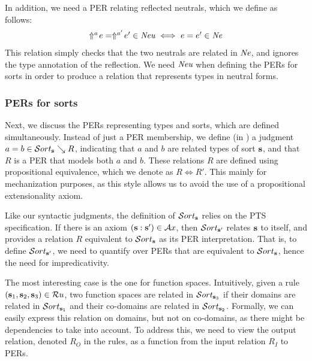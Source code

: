 In addition, we need a \ac{PER} relating reflected neutrals, which we define as follows:
\[
\begin{array}{l@{~\iff~}l}
  \perrel {\dreflect a e} {\dreflect {a'} {e'}} \perneu & \perrel e {e'} \perne
\end{array}
\]
This relation simply checks that the two neutrals are related in ${\normalfont\textit{Ne}}$, and ignores the type annotation of the reflection.
We need ${\normalfont\textit{Neu}}$ when defining the \acp{PER} for sorts in order to produce a relation that represents types in neutral forms.


\subsubsection{PERs for sorts}



Next, we discuss the \acp{PER} representing types and sorts, which are defined simultaneously.
Instead of just a \ac{PER} membership, we define (in ) a judgment $a = b \in \persort \searrow R$, indicating that $a$ and $b$ are related types of sort $\textbf{s}$,
  and that $R$ is a \ac{PER} that models both $a$ and $b$.
These relations $R$ are defined using propositional equivalence, which we denote as $R \iff R'$.
This mainly for mechanization purposes, as this style allows us to avoid the use of a propositional extensionality axiom.

Like our syntactic judgments, the definition of $\persort$ relies on the \ac{PTS} specification.
If there is an axiom $(\textbf{s} : \textbf{s}') \in \mathcal{A}x$, then $\persort[\tmcst s']$ relates $\textbf{s}$ to itself,
  and provides a relation $R$ equivalent to $\persort$ as its \ac{PER} interpretation.
That is, to define $\persort[\tmcst s']$, we need to quantify over \acp{PER} that are equivalent to $\persort$, hence the need for impredicativity.

The most interesting case is the one for function spaces.
Intuitively, given a rule $(\textbf{s}_1, \textbf{s}_2, \textbf{s}_3) \in \mathcal{R}u$, two function spaces are related in $\persort[\tmcst s_3]$
  if their domains are related in $\persort[\tmcst s_1]$ and their co-domains are related in $\persort[\tmcst s_2]$.
Formally, we can easily express this relation on domains, but not on co-domains, as there might be dependencies to take into account.
To address this, we need to view the output relation, denoted $R_O$ in the rules, as a function from the input relation $R_I$ to \acp{PER}.

